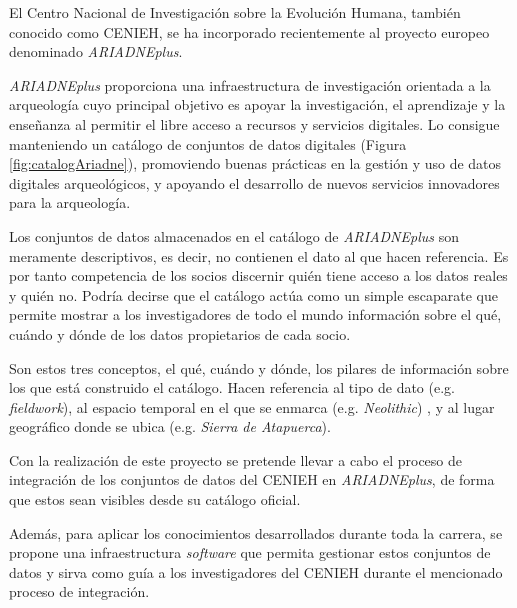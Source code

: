 
El Centro Nacional de Investigación sobre la Evolución Humana, también
conocido como CENIEH, se ha incorporado recientemente al proyecto
europeo denominado \emph{ARIADNEplus}. 

\emph{ARIADNEplus} proporciona una infraestructura de investigación orientada a la arqueología cuyo
principal objetivo es apoyar la investigación, el aprendizaje y la
enseñanza al permitir el libre acceso a recursos y servicios digitales.
Lo consigue manteniendo un catálogo de conjuntos de datos digitales
(Figura \ref{fig:catalogAriadne}), promoviendo buenas prácticas en la gestión y
uso de datos digitales arqueológicos, y apoyando el desarrollo de nuevos
servicios innovadores para la arqueología.


Los conjuntos de datos almacenados en el catálogo de \emph{ARIADNEplus}
son meramente descriptivos, es decir, no contienen el dato al que hacen
referencia. Es por tanto competencia de los socios discernir quién tiene
acceso a los datos reales y quién no. Podría decirse que el catálogo
actúa como un simple escaparate que permite mostrar a los
investigadores de todo el mundo información sobre el qué, cuándo y dónde
de los datos propietarios de cada socio.


Son estos tres conceptos, el qué, cuándo y dónde, los pilares de
información sobre los que está construido el catálogo. Hacen referencia
al tipo de dato (e.g. \emph{fieldwork}), al espacio temporal en el que
se enmarca (e.g. \emph{Neolithic}) , y al lugar geográfico donde se
ubica (e.g. \emph{Sierra de Atapuerca}).

Con la realización de este proyecto se pretende llevar a cabo el proceso
de integración de los conjuntos de datos del CENIEH en
\emph{ARIADNEplus}, de forma que estos sean visibles desde su catálogo
oficial.

Además, para aplicar los conocimientos desarrollados durante toda la
carrera, se propone una infraestructura \emph{software} que permita
gestionar estos conjuntos de datos y sirva como guía a los
investigadores del CENIEH durante el mencionado proceso de integración.



